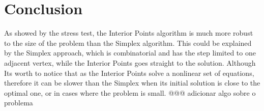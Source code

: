 \documentclass[a4paper]{IEEEtran}
\begin{document}
%






\section{Conclusion}
As showed by the stress test, the Interior Points algorithm is much more robust to the size of the problem than the Simplex algorithm. This could be explained by the Simplex approach, which is combinatorial and has the step limited to one adjacent vertex, while the Interior Points goes straight to the solution. Although Its worth to notice that as the Interior Points solve a nonlinear set of equations, therefore it can be slower than the Simplex when its initial solution is close to the optimal one, or in cases where the problem is small.
@@@ adicionar algo sobre o problema
\end{document}
